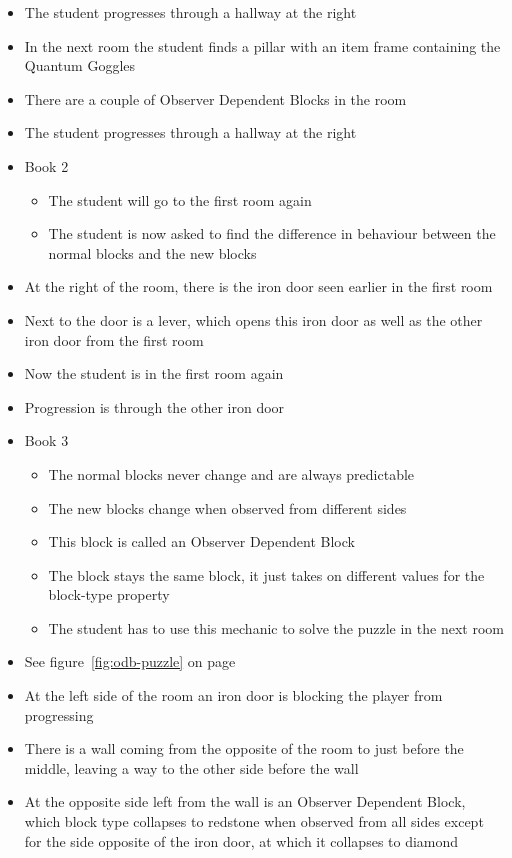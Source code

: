 \documentclass[11pt,twoside]{report} %
\begin{document}
\begin{itemize}
	\item The student progresses through a hallway at the right
	\item In the next room the student finds a pillar with an item frame containing the Quantum Goggles
	\item There are a couple of Observer Dependent Blocks in the room
	\item The student progresses through a hallway at the right
	\item Book 2
	\begin{itemize}
		\item The student will go to the first room again
		\item The student is now asked to find the difference in behaviour between the normal blocks and the new blocks
	\end{itemize}
	\item At the right of the room, there is the iron door seen earlier in the first room
	\item Next to the door is a lever, which opens this iron door as well as the other iron door from the first room
	\item Now the student is in the first room again
	\item Progression is through the other iron door
	\item Book 3
	\begin{itemize}
		\item The normal blocks never change and are always predictable
		\item The new blocks change when observed from different sides
		\item This block is called an Observer Dependent Block
		\item The block stays the same block, it just takes on different values for the block-type property
		\item The student has to use this mechanic to solve the puzzle in the next room
	\end{itemize}
	\item See figure~\ref{fig:odb-puzzle} on page~\pageref{fig:odb-puzzle}
	\item At the left side of the room an iron door is blocking the player from progressing
	\item There is a wall coming from the opposite of the room to just before the middle, leaving a way to the other side before the wall
	\item At the opposite side left from the wall is an Observer Dependent Block, which block type collapses to redstone when observed from all sides except for the side opposite of the iron door, at which it collapses to diamond

\end{itemize}
\end{document}
